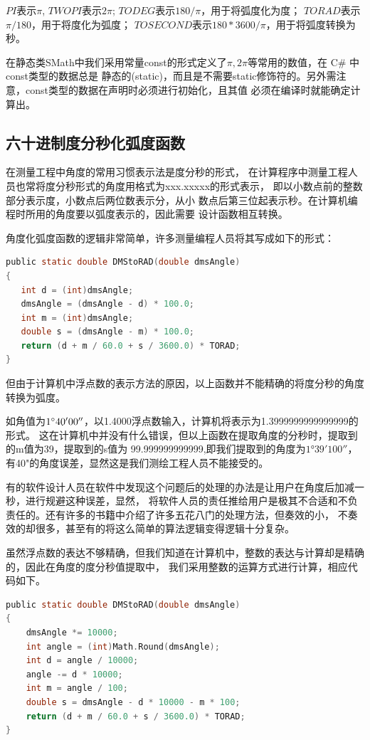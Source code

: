 $PI$表示$\pi$, $TWOPI$表示$2\pi$;
$TODEG$表示$180/\pi$，用于将弧度化为度；
$TORAD$表示$\pi/180$，用于将度化为弧度；
$TOSECOND$表示$180*3600/\pi$，用于将弧度转换为秒。

在静态类SMath中我们采用常量const的形式定义了$\pi, 2\pi$等常用的数值，在 C\# 中 const类型的数据总是
静态的(static)，而且是不需要static修饰符的。另外需注意，const类型的数据在声明时必须进行初始化，且其值
必须在编译时就能确定计算出。

\subsection{六十进制度分秒化弧度函数}

 在测量工程中角度的常用习惯表示法是度分秒的形式，
 在计算程序中测量工程人员也常将度分秒形式的角度用格式为xxx.xxxxx的形式表示，
 即以小数点前的整数部分表示度，小数点后两位数表示分，从小
 数点后第三位起表示秒。在计算机编程时所用的角度要以弧度表示的，因此需要
 设计函数相互转换。

 
角度化弧度函数的逻辑非常简单，许多测量编程人员将其写成如下的形式：

\begin{lstlisting}[language=C]
public static double DMStoRAD(double dmsAngle)
{
   int d = (int)dmsAngle;
   dmsAngle = (dmsAngle - d) * 100.0;
   int m = (int)dmsAngle;
   double s = (dmsAngle - m) * 100.0;
   return (d + m / 60.0 + s / 3600.0) * TORAD;
}
\end{lstlisting}

但由于计算机中浮点数的表示方法的原因，以上函数并不能精确的将度分秒的角度转换为弧度。

 如角值为$1^\circ 40'00''$，以1.4000浮点数输入，计算机将表示为1.3999999999999999的形式。
 这在计算机中并没有什么错误，但以上函数在提取角度的分秒时，提取到的m值为39，提取到的s值为
 99.999999999999,即我们提取到的角度为$1°39'100''$，有40"的角度误差，显然这是我们测绘工程人员不能接受的。
 
 有的软件设计人员在软件中发现这个问题后的处理的办法是让用户在角度后加减一秒，进行规避这种误差，显然，
 将软件人员的责任推给用户是极其不合适和不负责任的。还有许多的书籍中介绍了许多五花八门的处理方法，但奏效的小，
 不奏效的却很多，甚至有的将这么简单的算法逻辑变得逻辑十分复杂。
 
 虽然浮点数的表达不够精确，但我们知道在计算机中，整数的表达与计算却是精确的，因此在角度的度分秒值提取中，
 我们采用整数的运算方式进行计算，相应代码如下。
 
\begin{lstlisting}[language=C]
public static double DMStoRAD(double dmsAngle)
{
    dmsAngle *= 10000; 
    int angle = (int)Math.Round(dmsAngle);
    int d = angle / 10000;
    angle -= d * 10000;
    int m = angle / 100;
    double s = dmsAngle - d * 10000 - m * 100;
    return (d + m / 60.0 + s / 3600.0) * TORAD;
}
\end{lstlisting}


